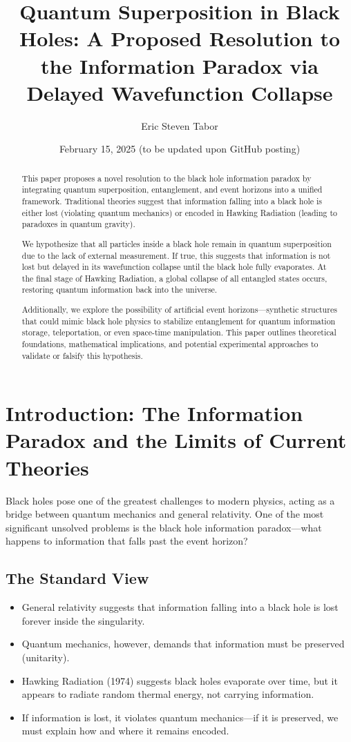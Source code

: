 \documentclass{article}
\title{Quantum Superposition in Black Holes: A Proposed Resolution to the Information Paradox via Delayed Wavefunction Collapse}
\author{Eric Steven Tabor}
\date{February 15, 2025 (to be updated upon GitHub posting)}
\begin{document}
\maketitle

\begin{abstract}
This paper proposes a novel resolution to the black hole information paradox by integrating quantum superposition, entanglement, and event horizons into a unified framework. Traditional theories suggest that information falling into a black hole is either lost (violating quantum mechanics) or encoded in Hawking Radiation (leading to paradoxes in quantum gravity).

We hypothesize that all particles inside a black hole remain in quantum superposition due to the lack of external measurement. If true, this suggests that information is not lost but delayed in its wavefunction collapse until the black hole fully evaporates. At the final stage of Hawking Radiation, a global collapse of all entangled states occurs, restoring quantum information back into the universe.

Additionally, we explore the possibility of artificial event horizons—synthetic structures that could mimic black hole physics to stabilize entanglement for quantum information storage, teleportation, or even space-time manipulation. This paper outlines theoretical foundations, mathematical implications, and potential experimental approaches to validate or falsify this hypothesis.
\end{abstract}

\section{Introduction: The Information Paradox and the Limits of Current Theories}

Black holes pose one of the greatest challenges to modern physics, acting as a bridge between quantum mechanics and general relativity. One of the most significant unsolved problems is the black hole information paradox—what happens to information that falls past the event horizon?

\subsection{The Standard View}
\begin{itemize}
    \item General relativity suggests that information falling into a black hole is lost forever inside the singularity.
    \item Quantum mechanics, however, demands that information must be preserved (unitarity).
    \item Hawking Radiation (1974) suggests black holes evaporate over time, but it appears to radiate random thermal energy, not carrying information.
    \item If information is lost, it violates quantum mechanics—if it is preserved, we must explain how and where it remains encoded.
\end{itemize}
\end{document}
